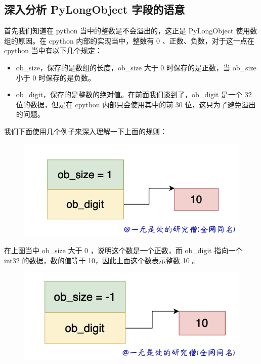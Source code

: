 \subsection{深入分析 PyLongObject 字段的语意}
首先我们知道在 python 当中的整数是不会溢出的，这正是 PyLongObject 使用数组的原因。在 cpython 内部的实现当中，整数有 0 、正数、负数，对于这一点在 cpython 当中有以下几个规定：
\begin{itemize}
\item ob\_size，保存的是数组的长度，ob\_size 大于 0 时保存的是正数，当 ob\_size 小于 0 时保存的是负数。 
\item ob\_digit，保存的是整数的绝对值。在前面我们谈到了，ob\_digit 是一个 32 位的数据，但是在 cpython 内部只会使用其中的前 30 位，这只为了避免溢出的问题。 
\end{itemize}
我们下面使用几个例子来深入理解一下上面的规则：

    \begin{figure}[H]
        \centering
            \includegraphics[scale=.3]{images/16-int.png}
            \caption{ }
        \label{fig:my_label}
    \end{figure}
    
在上图当中 ob\_size  大于 0 ，说明这个数是一个正数，而 ob\_digit 指向一个 int32 的数据，数的值等于 10，因此上面这个数表示整数 10 。

    \begin{figure}[H]
        \centering
            \includegraphics[scale=.3]{images/17-int.png}
            \caption{ }
        \label{fig:my_label}
    \end{figure}
    
